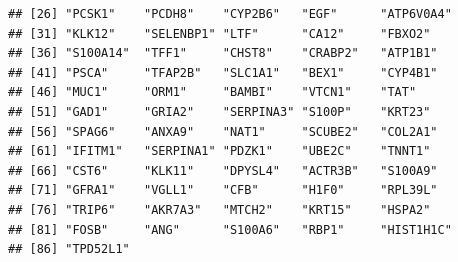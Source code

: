 \documentclass{article}\usepackage[]{graphicx}\usepackage[]{color}
\makeatletter
\newenvironment{kframe}{%
 \def\at@end@of@kframe{}%
 \ifinner\ifhmode%
  \def\at@end@of@kframe{\end{minipage}}%
  \begin{minipage}{\columnwidth}%
 \fi\fi%
 \def\FrameCommand##1{\hskip\@totalleftmargin \hskip-\fboxsep
 \colorbox{shadecolor}{##1}\hskip-\fboxsep
     \hskip-\linewidth \hskip-\@totalleftmargin \hskip\columnwidth}%
 \MakeFramed {\advance\hsize-\width
   \@totalleftmargin\z@ \linewidth\hsize
   \@setminipage}}%
 {\par\unskip\endMakeFramed%
 \at@end@of@kframe}
\newenvironment{knitrout}{}{} %
\makeatother
\begin{document}
\begin{knitrout}
\begin{kframe}
\begin{verbatim}
## [26] "PCSK1"    "PCDH8"    "CYP2B6"   "EGF"      "ATP6V0A4"
## [31] "KLK12"    "SELENBP1" "LTF"      "CA12"     "FBXO2"   
## [36] "S100A14"  "TFF1"     "CHST8"    "CRABP2"   "ATP1B1"  
## [41] "PSCA"     "TFAP2B"   "SLC1A1"   "BEX1"     "CYP4B1"  
## [46] "MUC1"     "ORM1"     "BAMBI"    "VTCN1"    "TAT"     
## [51] "GAD1"     "GRIA2"    "SERPINA3" "S100P"    "KRT23"   
## [56] "SPAG6"    "ANXA9"    "NAT1"     "SCUBE2"   "COL2A1"  
## [61] "IFITM1"   "SERPINA1" "PDZK1"    "UBE2C"    "TNNT1"   
## [66] "CST6"     "KLK11"    "DPYSL4"   "ACTR3B"   "S100A9"  
## [71] "GFRA1"    "VGLL1"    "CFB"      "H1F0"     "RPL39L"  
## [76] "TRIP6"    "AKR7A3"   "MTCH2"    "KRT15"    "HSPA2"   
## [81] "FOSB"     "ANG"      "S100A6"   "RBP1"     "HIST1H1C"
## [86] "TPD52L1"
\end{verbatim}
\end{kframe}
\end{knitrout}
\end{document}
